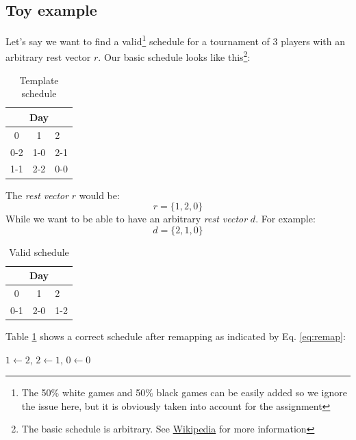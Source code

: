 \documentclass[a4paper, 10pt]{article}
\begin{document}
\subsection{Toy example}
Let's say we want to find a valid\footnote{The 50\% white games and 50\% black games can be easily added so we ignore the issue here, but it is obviously taken into account for the assignment} schedule for a tournament of 3 players with an arbitrary rest vector $r$. Our basic schedule
looks like this\footnote{The basic schedule is arbitrary. See \href{https://en.wikipedia.org/wiki/Round-robin\_tournament\#Berger\_tables}{Wikipedia} for more information}:

\begin{minipage}[t]{0.45\linewidth}
    \begin{table}[H]
	    \centering
	    \begin{tabular}{ccl}
		\multicolumn{3}{c}{Day}                                 \\ \hline
		\multicolumn{1}{c}{0}  & \multicolumn{1}{c}{1}  & 2     \\ \hline
		0-2                     & 1-0                     & 2-1 \\
		\multicolumn{1}{l}{1-1} & \multicolumn{1}{l}{2-2} & 0-0 \\
		\hline
	    \end{tabular}
	\caption{Template schedule}
    \end{table}
    The \textit{rest vector} $r$ would be:
    \begin{equation*}
	r = \{1, 2, 0\}
    \end{equation*}
    While we want to be able to have an arbitrary \textit{rest vector} $d$. For example:
    \begin{equation*}
	d = \{2, 1, 0\}
    \end{equation*}
\end{minipage} \hfill
\begin{minipage}[t]{0.45\linewidth}
    \begin{table}[H]
	    \centering
	    \begin{tabular}{ccl}
		\multicolumn{3}{c}{Day}                                 \\ \hline
		\multicolumn{1}{c}{0}  & \multicolumn{1}{c}{1}  & 2   \\ \hline
		0-1                     & 2-0                     & 1-2 \\
		\hline
	    \end{tabular}
	\caption{Valid schedule}
	\label{table:remap}
    \end{table}
    Table \ref{table:remap} shows a correct schedule after remapping as indicated by Eq. \ref{eq:remap}: 

    \begin{center}
    $1 \leftarrow 2$, $2 \leftarrow 1$, $0 \leftarrow 0$
    \end{center}

\end{minipage}
\end{document}
